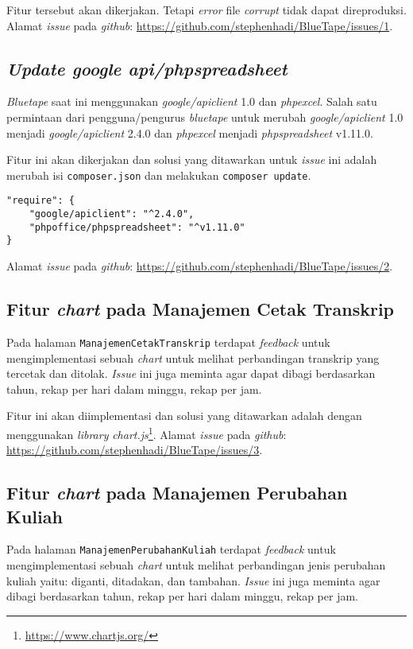 Fitur tersebut akan dikerjakan. Tetapi \textit{error} file \textit{corrupt} tidak dapat direproduksi. Alamat \textit{issue} pada \textit{github}: \url{https://github.com/stephenhadi/BlueTape/issues/1}. 

\subsection{\textit{Update google api/phpspreadsheet}}
\label{issue:2}
\textit{Bluetape} saat ini menggunakan \textit{google/apiclient} 1.0 dan \textit{phpexcel}. Salah satu permintaan dari pengguna/pengurus \textit{bluetape} untuk merubah \textit{google/apiclient} 1.0 menjadi \textit{google/apiclient} 2.4.0 dan \textit{phpexcel} menjadi \textit{phpspreadsheet} v1.11.0. 

Fitur ini akan dikerjakan dan solusi yang ditawarkan untuk \textit{issue} ini adalah merubah isi \texttt{composer.json} dan melakukan \texttt{composer update}.
\begin{lstlisting}
"require": {
	"google/apiclient": "^2.4.0",
	"phpoffice/phpspreadsheet": "^v1.11.0"
}
\end{lstlisting}

Alamat \textit{issue} pada \textit{github}: \url{https://github.com/stephenhadi/BlueTape/issues/2}. 
\subsection{Fitur \textit{chart} pada Manajemen Cetak Transkrip}
\label{issue:3}
Pada halaman \texttt{ManajemenCetakTranskrip} terdapat \textit{feedback} untuk mengimplementasi sebuah \textit{chart} untuk melihat perbandingan transkrip yang tercetak dan ditolak. \textit{Issue} ini juga meminta agar dapat dibagi berdasarkan tahun, rekap per hari dalam minggu, rekap per jam.

Fitur ini akan diimplementasi dan solusi yang ditawarkan adalah dengan menggunakan \textit{library} \textit{chart.js}\footnote{\label{ft:chartjs}\url{https://www.chartjs.org/}}. Alamat \textit{issue} pada \textit{github}: \url{https://github.com/stephenhadi/BlueTape/issues/3}.

\subsection{Fitur \textit{chart} pada Manajemen Perubahan Kuliah}
\label{issue:4}
Pada halaman \texttt{ManajemenPerubahanKuliah} terdapat \textit{feedback} untuk mengimplementasi sebuah \textit{chart} untuk melihat perbandingan jenis perubahan kuliah yaitu: diganti, ditadakan, dan tambahan. \textit{Issue} ini juga meminta agar dibagi berdasarkan tahun, rekap per hari dalam minggu, rekap per jam.

